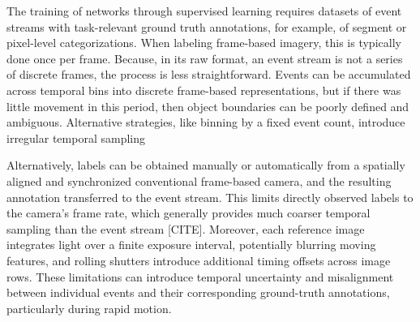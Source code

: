 
The training of networks through supervised learning requires datasets of event streams with task-relevant ground truth annotations, for example, of segment or pixel-level categorizations. When labeling frame-based imagery, this is typically done once per frame.  Because, in its raw format, an event stream is not a series of discrete frames, the process is less straightforward. Events can be accumulated across temporal bins into discrete frame-based representations, but if there was little movement in this period, then object boundaries can be poorly defined and ambiguous.  Alternative strategies, like binning by a fixed event count, introduce irregular temporal sampling

Alternatively, labels can be obtained manually or automatically from a spatially aligned and synchronized conventional frame-based camera, and the resulting annotation transferred to the event stream. This limits directly observed labels to the camera’s frame rate, which generally provides much coarser temporal sampling than the event stream [CITE]. Moreover, each reference image integrates light over a finite exposure interval, potentially blurring moving features, and rolling shutters introduce additional timing offsets across image rows. These limitations can introduce temporal uncertainty and misalignment between individual events and their corresponding ground-truth annotations, particularly during rapid motion.


